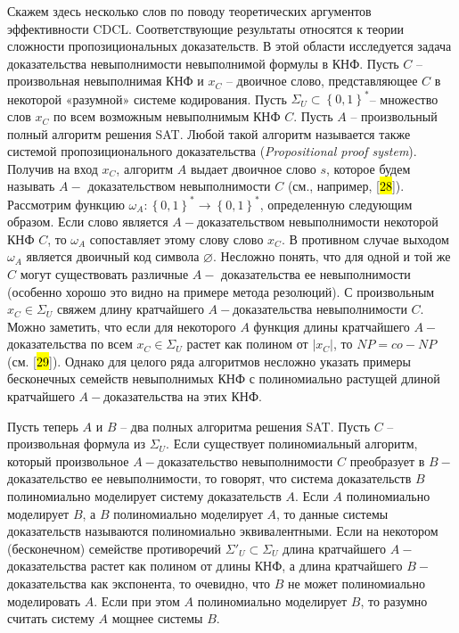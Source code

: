 Скажем здесь несколько слов по поводу теоретических аргументов эффективности CDCL. Соответствующие результаты относятся к теории сложности пропозициональных доказательств. В этой области исследуется задача доказательства невыполнимости невыполнимой формулы в КНФ. Пусть $C$ -- произвольная невыполнимая КНФ и $x_{C}$ -- двоичное слово, представляющее $C$ в некоторой «разумной» системе кодирования. Пусть $\Sigma_{U} \subset \left\{ 0,1 \right\}^{*}$-- множество слов $x_{C}$ по всем возможным невыполнимым КНФ $C$. Пусть $A$ -- произвольный полный алгоритм решения SAT. Любой такой алгоритм называется также системой пропозиционального доказательства (\textit{Propositional proof system}). Получив на вход $x_{C}$, алгоритм $A$ выдает двоичное слово $s$, которое будем называть $A -$ доказательством невыполнимости $C$ (см., например, {[}\hl{28}{]}). Рассмотрим функцию $\omega_{A}:\left\{ 0,1 \right\}^{*} \to \left\{ 0,1 \right\}^{*}$, определенную следующим образом. Если слово является $A -$доказательством невыполнимости некоторой КНФ $C$, то $\omega_{A}$ сопоставляет этому слову слово $x_{C}$. В противном случае выходом $\omega_{A}$ является двоичный код символа $\varnothing$. Несложно понять, что для одной и той же $C$ могут существовать различные $A -$ доказательства ее невыполнимости (особенно хорошо это видно на примере метода резолюций). С произвольным $x_{C} \in \Sigma_{U}$ свяжем длину кратчайшего $A -$доказательства невыполнимости $C$. Можно заметить, что если для некоторого $A$ функция длины кратчайшего $A -$доказательства по всем $x_{C} \in \Sigma_{U}$ растет как полином от $|x_{C}|$, то $NP = co - NP$ (см. {[}\hl{29}{]}). Однако для целого ряда алгоритмов несложно указать примеры бесконечных семейств невыполнимых КНФ с полиномиально растущей длиной кратчайшего $A -$доказательства на этих КНФ.

Пусть теперь $A$ и $B$ -- два полных алгоритма решения SAT. Пусть $C$ -- произвольная формула из $\Sigma_{U}$. Если существует полиномиальный алгоритм, который произвольное $A -$доказательство невыполнимости $C$ преобразует в $B -$доказательство ее невыполнимости, то говорят, что система доказательств $B$ полиномиально моделирует систему доказательств $A$. Если $A$ полиномиально моделирует $B$, а $B$ полиномиально моделирует $A$, то данные системы доказательств называются полиномиально эквивалентными. Если на некотором (бесконечном) семействе противоречий ${\Sigma'}_{U} \subset \Sigma_{U}$ длина кратчайшего $A -$доказательства растет как полином от длины КНФ, а длина кратчайшего $B -$ доказательства как экспонента, то очевидно, что $B$ не может полиномиально моделировать $A$. Если при этом $A$ полиномиально моделирует $B$, то разумно считать систему $A$ мощнее системы $B$.

